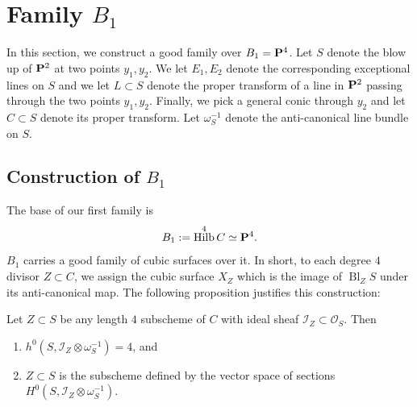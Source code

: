\documentclass[12pt,reqno]{amsart}
\DeclareMathOperator{\Bl}{Bl}
\DeclareMathOperator{\Hilb}{Hilb}
\numberwithin{equation}{section}
\begin{document}


\section{Family $B_1$}
\label{sec:first-test-family}

In this section, we construct a good family over $B_{1} = \P^{4}$.
Let $S$ denote the blow up of $\P^{2}$ at two points $y_1,y_2$. We let
$E_{1}, E_{2}$ denote the corresponding exceptional lines on $S$ and
we let $L \subset S$ denote the proper transform of a line in $\P^2$
passing through the two points $y_1,y_2$. Finally, we pick a general
conic through $y_{2}$ and let $C \subset S$ denote its proper
transform. Let $\omega_{S}^{-1}$ denote the anti-canonical line bundle
on $S$.  

\subsection{Construction of $B_1$}
\label{sec:construction-b_1}


The base of our first family is
\begin{align}
  \label{eq:B1}
  B_1 := \Hilb^{4}C \simeq \P^{4}.
\end{align}
$B_1$ carries a good family of cubic surfaces over it.  In short, to
each degree $4$ divisor $Z \subset C$, we assign the cubic surface
$X_{Z}$ which is the image of $\Bl_{Z}S$ under its anti-canonical
map. The following proposition justifies this construction:

\begin{proposition}
  \label{prop:B1} Let $Z \subset S$ be any length $4$ subscheme of $C$
  with ideal sheaf $\mathcal{I}_{Z} \subset \mathcal{O}_{S}$. Then
  \begin{enumerate}
  \item $h^{0}(S, \mathcal{I}_{Z} \otimes \omega_{S}^{-1}) = 4$, and
  \item $Z \subset S$ is the subscheme defined by the vector space of
    sections $H^{0}(S, \mathcal{I}_{Z} \otimes \omega_{S}^{-1})$.
  \end{enumerate}
\end{proposition}
\end{document}
